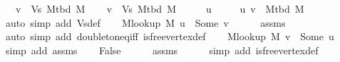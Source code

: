 \begin{isabellebody}
\ \ \ {\isachardoublequoteopen}v\ {\isasymnotin}\ Vs\ {\isacharparenleft}{\kern0pt}M{\isacharunderscore}{\kern0pt}tbd\ M{\isacharparenright}{\kern0pt}{\isachardoublequoteclose}%
\endisataginvisible
{\isafoldinvisible}%
%
\isadeliminvisible
\isanewline
%
\endisadeliminvisible
%
\isadelimproof
%
\endisadelimproof
%
\isatagproof
{}\isamarkupfalse%
\isanewline
\ \ \isamarkupfalse%
\ {\isachardoublequoteopen}v\ {\isasymin}\ Vs\ {\isacharparenleft}{\kern0pt}M{\isacharunderscore}{\kern0pt}tbd\ M{\isacharparenright}{\kern0pt}{\isachardoublequoteclose}\isanewline
\ \ \isamarkupfalse%
\ \isamarkupfalse%
\ u\ \isanewline
\ \ \ \ {\isachardoublequoteopen}{\isacharbraceleft}{\kern0pt}u{\isacharcomma}{\kern0pt}\ v{\isacharbraceright}{\kern0pt}\ {\isasymin}\ M{\isacharunderscore}{\kern0pt}tbd\ M{\isachardoublequoteclose}\isanewline
\ \ \ \ \isamarkupfalse%
\ {\isacharparenleft}{\kern0pt}auto\ simp\ add{\isacharcolon}{\kern0pt}\ Vs{\isacharunderscore}{\kern0pt}def{\isacharparenright}{\kern0pt}\isanewline
\ \ \isamarkupfalse%
\ {\isachardoublequoteopen}M{\isacharunderscore}{\kern0pt}lookup\ M\ u\ {\isacharequal}{\kern0pt}\ Some\ v{\isachardoublequoteclose}\isanewline
\ \ \ \ \isamarkupfalse%
\ assms{\isacharparenleft}{\kern0pt}{}{\isacharparenright}{\kern0pt}\isanewline
\ \ \ \ \isamarkupfalse%
\ {\isacharparenleft}{\kern0pt}auto\ simp\ add{\isacharcolon}{\kern0pt}\ doubleton{\isacharunderscore}{\kern0pt}eq{\isacharunderscore}{\kern0pt}iff\ is{\isacharunderscore}{\kern0pt}free{\isacharunderscore}{\kern0pt}vertex{\isacharunderscore}{\kern0pt}def{\isacharparenright}{\kern0pt}\isanewline
\ \ \isamarkupfalse%
\ {\isachardoublequoteopen}M{\isacharunderscore}{\kern0pt}lookup\ M\ v\ {\isacharequal}{\kern0pt}\ Some\ u{\isachardoublequoteclose}\isanewline
\ \ \ \ \isamarkupfalse%
\ {\isacharparenleft}{\kern0pt}simp\ add{\isacharcolon}{\kern0pt}\ assms{\isacharparenleft}{\kern0pt}{}{\isacharparenright}{\kern0pt}{\isacharparenright}{\kern0pt}\isanewline
\ \ \isamarkupfalse%
\ False\isanewline
\ \ \ \ \isamarkupfalse%
\ assms{\isacharparenleft}{\kern0pt}{}{\isacharparenright}{\kern0pt}\isanewline
\ \ \ \ \isamarkupfalse%
\ {\isacharparenleft}{\kern0pt}simp\ add{\isacharcolon}{\kern0pt}\ is{\isacharunderscore}{\kern0pt}free{\isacharunderscore}{\kern0pt}vertex{\isacharunderscore}{\kern0pt}def{\isacharparenright}{\kern0pt}\isanewline

\end{isabellebody}
